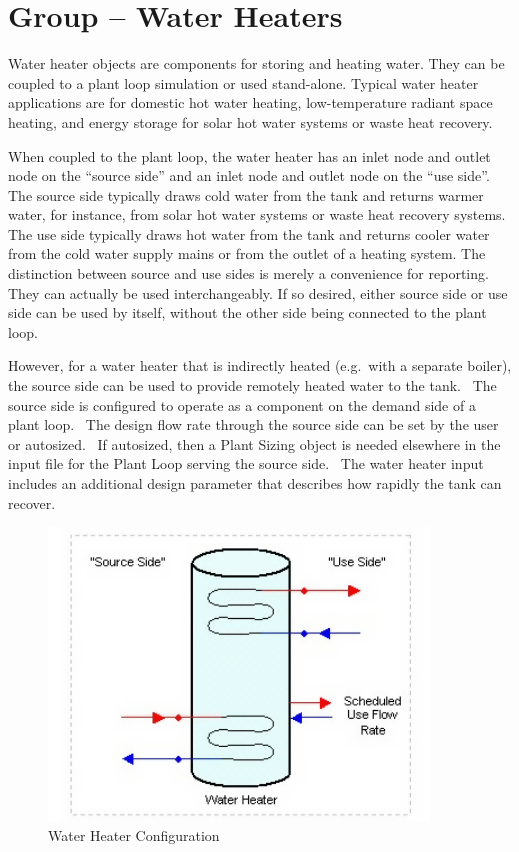\section{Group -- Water Heaters}\label{group-water-heaters}

Water heater objects are components for storing and heating water. They can be coupled to a plant loop simulation or used stand-alone. Typical water heater applications are for domestic hot water heating, low-temperature radiant space heating, and energy storage for solar hot water systems or waste heat recovery.

When coupled to the plant loop, the water heater has an inlet node and outlet node on the ``source side'' and an inlet node and outlet node on the ``use side''. The source side typically draws cold water from the tank and returns warmer water, for instance, from solar hot water systems or waste heat recovery systems. The use side typically draws hot water from the tank and returns cooler water from the cold water supply mains or from the outlet of a heating system. The distinction between source and use sides is merely a convenience for reporting. They can actually be used interchangeably. If so desired, either source side or use side can be used by itself, without the other side being connected to the plant loop.

However, for a water heater that is indirectly heated (e.g.~with a separate boiler), the source side can be used to provide remotely heated water to the tank.~ The source side is configured to operate as a component on the demand side of a plant loop.~ The design flow rate through the source side can be set by the user or autosized.~ If autosized, then a Plant Sizing object is needed elsewhere in the input file for the Plant Loop serving the source side.~ The water heater input includes an additional design parameter that describes how rapidly the tank can recover.

\begin{figure}[hbtp] %
\centering
\includegraphics[width=0.9\textwidth, height=0.9\textheight, keepaspectratio=true]{media/image191.png}
\caption{Water Heater Configuration \protect \label{fig:water-heater-configuration}}
\end{figure}

